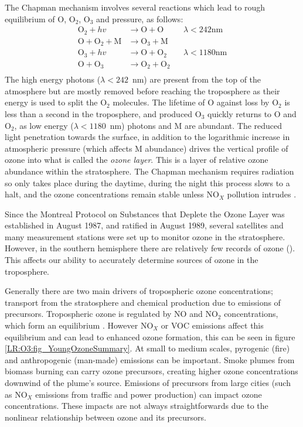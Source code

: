  The Chapman mechanism involves several reactions which lead to rough equilibrium of O, O$_2$, O$_3$ and pressure, as follows:
  \begin{equation}
    \begin{aligned}
      \text{O}_2 + hv              & \to \text{O}+\text{O}     && \lambda < 242 \text{nm} \\
      \text{O}+\text{O}_2+\text{M} & \to \text{O}_3+\text{M}   &&    \\
      \text{O}_3 + hv              & \to \text{O}+\text{O}_2   && \lambda < 1180 \text{nm} \\
      \text{O} + \text{O}_3        & \to \text{O}_2+\text{O}_2 &&       \\
    \end{aligned}
    \label{LR:O3:eqn_Chapman}
  \end{equation}
  The high energy photons ($\lambda < 242$~nm) are present from the top of the atmosphere but are mostly removed before reaching the troposphere as their energy is used to split the O$_2$ molecules.
  The lifetime of O against loss by O$_2$ is less than a second in the troposphere, and produced O$_3$ quickly returns to O and O$_2$, as low energy ($\lambda < 1180$~nm) photons and M are abundant.
  The reduced light penetration towards the surface, in addition to the logarithmic increase in atmospheric pressure (which affects M abundance) drives the vertical profile of ozone into what is called the \textit{ozone layer}.
  This is a layer of relative ozone abundance within the stratosphere.
  The Chapman mechanism requires radiation so only takes place during the daytime, during the night this process slows to a halt, and the ozone concentrations remain stable unless NO$_X$ pollution intrudes \citep[Chapter 10]{Jacob_1999_book}.
  
  
  Since the Montreal Protocol on Substances that Deplete the Ozone Layer was established in August 1987, and ratified in August 1989, several satellites and many measurement stations were set up to monitor ozone in the stratosphere.
  However, in the southern hemisphere there are relatively few records of ozone (\cite{Huang2017}).
  This affects our ability to accurately determine sources of ozone in the troposphere.
  
  
  Generally there are two main drivers of tropospheric ozone concentrations; transport from the stratosphere and chemical production due to emissions of precursors. 
  Tropospheric ozone is regulated by NO and NO$_2$ concentrations, which form an equilibrium \citep{Cape2008,Young2018}.
  However NO$_X$ or VOC emissions affect this equilibrium and can lead to enhanced ozone formation, this can be seen in figure \ref{LR:O3:fig_YoungOzoneSummary}.
  At small to medium scales, pyrogenic (fire) and anthropogenic (man-made) emissions can be important.
  Smoke plumes from biomass burning can carry ozone precursors, creating higher ozone concentrations downwind of the plume's source.
  Emissions of precursors from large cities (such as NO$_X$ emissions from traffic and power production) can impact ozone concentrations.
  These impacts are not always straightforwards due to the nonlinear relationship between ozone and its precursors.
  
